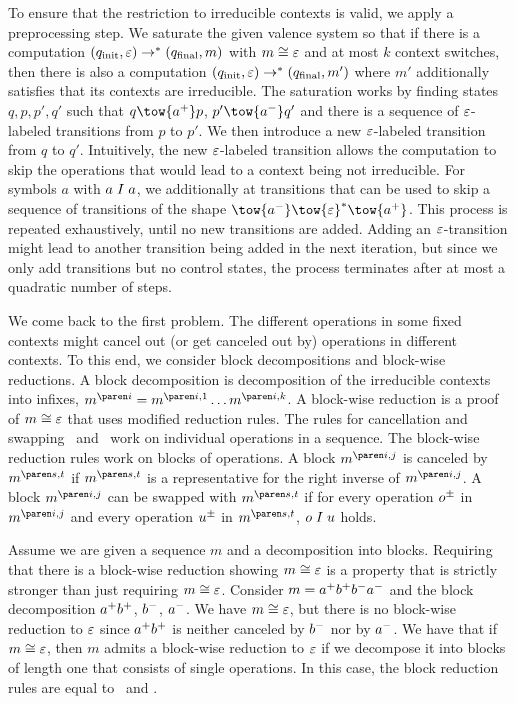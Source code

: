 \documentclass[../../diss.tex]{subfiles}
\begin{document}
To ensure that the restriction to irreducible contexts is valid, we apply a preprocessing step.
We saturate the given valence system so that if there is a computation $(q_{\text{init}},\varepsilon) \to^* (q_{\text{final}},m)$ with $m \cong \varepsilon$ and at most $k$ context switches, then there is also a computation $(q_{\text{init}},\varepsilon) \to^*(q_{\text{final}},m')$ where $m'$ additionally satisfies that its contexts are irreducible.
The saturation works by finding states $q,p,p',q'$ such that $q \tow{\inc{a}} p$, $p' \tow{\dec{a}} q'$ and there is a sequence of $\varepsilon$-labeled transitions from $p$ to $p'$.
We then introduce a new $\varepsilon$-labeled transition from $q$ to $q'$.
Intuitively, the new $\varepsilon$-labeled transition allows the computation to skip the operations that would lead to a context being not irreducible.
For symbols $a$ with $a \mathrel{I} a$, we additionally at transitions that can be used to skip a sequence of transitions of the shape $\tow{\dec{a}} \tow{\eps}^* \tow{\inc{a}}$.
This process is repeated exhaustively, until no new transitions are added.
Adding an $\varepsilon$-transition might lead to another transition being added in the next iteration, but since we only add transitions but no control states, the process terminates after at most a quadratic number of steps.

We come back to the first problem.
The different operations in some fixed contexts might cancel out (or get canceled out by) operations in different contexts.
To this end, we consider block decompositions and block-wise reductions.
A block decomposition is decomposition of the irreducible contexts into infixes, \eg $\itr{m}{i} = \itr{m}{i,1} \ldots \itr{m}{i,k}$.
A block-wise reduction is a proof of $m \cong \varepsilon$ that uses modified reduction rules.
The rules for cancellation and swapping \RuleCancel~and \RuleSwap~work on individual operations in a sequence.
The block-wise reduction rules work on blocks of operations.
A block $\itr{m}{i,j}$ is canceled by $\itr{m}{s,t}$ if $\itr{m}{s,t}$ is a representative for the right inverse of $\itr{m}{i,j}$.
A block $\itr{m}{i,j}$ can be swapped with $\itr{m}{s,t}$ if for every operation ${o}^\pm$ in $\itr{m}{i,j}$ and every operation ${u}^\pm$ in $\itr{m}{s,t}$, $o \mathrel{I} u$ holds.

Assume we are given a sequence $m$ and a decomposition into blocks.
Requiring that there is a block-wise reduction showing $m \cong \varepsilon$ is a  property that is strictly stronger than just requiring $m \cong \varepsilon$.
Consider $m = {a}^+{b}^+{b}^-{a}^-$ and the block decomposition ${a}^+{b}^+$, ${b}^-$, ${a}^-$.
We have $m \cong \varepsilon$, but there is no block-wise reduction to $\varepsilon$ since ${a}^+{b}^+$ is neither canceled by ${b}^-$ nor by ${a}^-$.
We have that if $m \cong \varepsilon$, then $m$ admits a block-wise reduction to $\varepsilon$ if we decompose it into blocks of length one that consists of single operations.
In this case, the block reduction rules are equal to \RuleCancel~and \RuleSwap.
\end{document}
